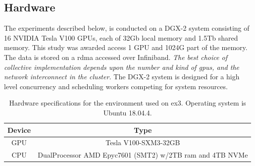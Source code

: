 \subsection{Hardware} \label{sec:hardware}
The experiments described below, is conducted on a 
DGX-2 system consisting of 16 NVIDIA Tesla V100 GPUs, each of 32Gb local memory and 1.5Tb shared memory. %
This study was awarded access 1 GPU and 1024G part of the memory. The data is stored on a \acrfull{rdma} accessed over Infiniband. \textit{The best choice of collective implementation depends upon the number and kind of \acrshort{gpu}s, and the network interconnect in the cluster.} The DGX-2 system is designed for a high level concurrency and scheduling workers competing for system resources.
\begin{table}[ht]
    \centering
    \begin{tabular}{c|c}
        Device &  Type  \\ \hline
        GPU & Tesla V100-SXM3-32GB \\
        CPU & DualProcessor AMD Epyc7601 (SMT2) w/2TB ram and 4TB NVMe 
    \end{tabular}
    \caption{Hardware specifications for the environment used on \acrshort{ex3}. Operating system is Ubuntu 18.04.4.}
    \label{tab:hardware_ex3}
\end{table}

